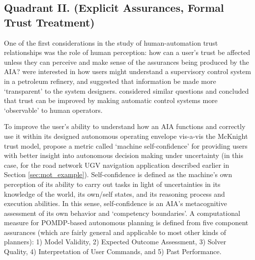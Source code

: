 \subsection{Quadrant II. (Explicit Assurances, Formal Trust Treatment)}\label{sec:q2}
One of the first considerations in the study of human-automation trust relationships was the role of human perception: how can a user's trust be affected unless they can perceive and make sense of the assurances being produced by the AIA? 
\citet{Sheridan1984-kx} were interested in how users might understand a supervisory control system in a petroleum refinery, and suggested that information be made more `transparent' to the system designers. \citet{Muir1994-ow} considered similar questions and concluded that trust can be improved by making automatic control systems more `observable' to human operators. 

To improve the user's ability to understand how an AIA functions and correctly use it within its designed autonomous operating envelope vis-a-vis the McKnight trust model, \citet{Aitken2016-cv} propose a metric called `machine self-confidence' for providing users with better insight into autonomous decision making under uncertainty (in this case, for the road network UGV navigation application described earlier in Section \ref{sec:mot_example}). 
Self-confidence is defined as the machine's own perception of its ability to carry out tasks in light of uncertainties in its knowledge of the world, its own/self states, and its reasoning process and execution abilities. 
In this sense, self-confidence is an AIA's metacognitive assessment of its own behavior and `competency boundaries'. 
A computational measure for POMDP-based autonomous planning is defined from five component assurances (which are fairly general and applicable to most other kinds of planners): 1) Model Validity, 2) Expected Outcome Assessment, 3) Solver Quality, 4) Interpretation of User Commands, and 5) Past Performance. 

